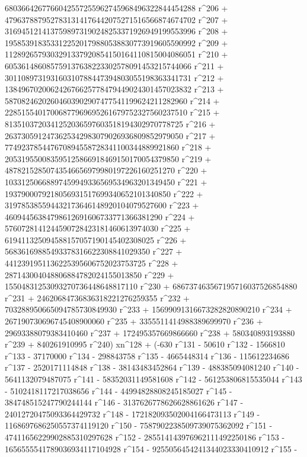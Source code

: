        6803664267766042557255962745968496322844454288 r^206 + 
       4796378879527831314176442075271516566874674702 r^207 + 
       3169451214137598973190248253371926949199553996 r^208 + 
       1958539183533122520179880538830773919605590992 r^209 + 
       1128926579303291337920854150164110815004086051 r^210 + 
       605361486085759137638223302578091453215744066 r^211 + 
       301108973193160310788447394803055198363341731 r^212 + 
       138496702006242676625778479449024301457023832 r^213 + 
       58708246202604603902907477541199624211282960 r^214 + 
       22851554017006877969695261679752327560237510 r^215 + 
       8135103720341252036597603518194302970778725 r^216 + 
       2637305912473625342983079026936809852979050 r^217 + 
       774923785447670894558728341100344889921860 r^218 + 
       205319550083595125866918469150170054379850 r^219 + 
       48782152850743546656979980197226160251270 r^220 + 
       10331250668897459949336569534963201349450 r^221 + 
       1937900079218056931517699340652101340850 r^222 + 
       319785385594432173646148920104079527600 r^223 + 
       46094456384798612691606733771366381290 r^224 + 
       5760728141244590728423181460613974030 r^225 + 
       619411325094588157057190145402308025 r^226 + 
       56836169885493378316622308841029350 r^227 + 
       4412391951136225395606752023753725 r^228 + 
       287143004048806884782024155013850 r^229 + 
       15504831253093270736448648817110 r^230 + 
       686737463567195716037526854880 r^231 + 
       24620684736836318221276259355 r^232 + 
       703288950665094785730849930 r^233 + 
       15699091316673282820890210 r^234 + 
       267190730696745408900060 r^235 + 
       3355511414988389699970 r^236 + 29693388079383410460 r^237 + 
       172495357669866660 r^238 + 580340893193880 r^239 + 
       840261910995 r^240) xn^128 + (-630 r^131 - 50610 r^132 - 
       1566810 r^133 - 37170000 r^134 - 298843758 r^135 - 
       4665448314 r^136 - 115612234686 r^137 - 2520171114848 r^138 - 
       38143483452864 r^139 - 488385094081240 r^140 - 
       5641132079487075 r^141 - 58352031149581608 r^142 - 
       561253806815535044 r^143 - 5102418117217038656 r^144 - 
       44994828808245185027 r^145 - 384748515247790244144 r^146 - 
       3137626778626628861626 r^147 - 24012720475093364429732 r^148 - 
       172182093502004166473113 r^149 - 
       1168697686250557374119120 r^150 - 
       7587902238509739075362092 r^151 - 
       47411656229902885310297628 r^152 - 
       285514143976962111492250186 r^153 - 
       1656555541789036934117104928 r^154 - 
       9255056454241344023330410912 r^155 - 
